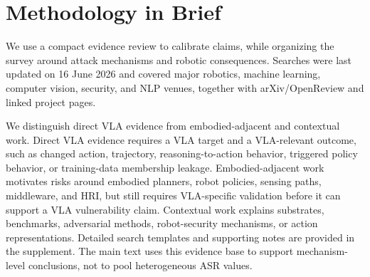 \section{Methodology in Brief}
\label{sec:methodology}

We use a compact evidence review to calibrate claims, while organizing the survey around attack mechanisms and robotic consequences. Searches were last updated on 16 June 2026 and covered major robotics, machine learning, computer vision, security, and NLP venues, together with arXiv/OpenReview and linked project pages.

We distinguish direct VLA evidence from embodied-adjacent and contextual work. Direct VLA evidence requires a VLA target and a VLA-relevant outcome, such as changed action, trajectory, reasoning-to-action behavior, triggered policy behavior, or training-data membership leakage. Embodied-adjacent work motivates risks around embodied planners, robot policies, sensing paths, middleware, and HRI, but still requires VLA-specific validation before it can support a VLA vulnerability claim. Contextual work explains substrates, benchmarks, adversarial methods, robot-security mechanisms, or action representations. Detailed search templates and supporting notes are provided in the supplement. The main text uses this evidence base to support mechanism-level conclusions, not to pool heterogeneous ASR values.
